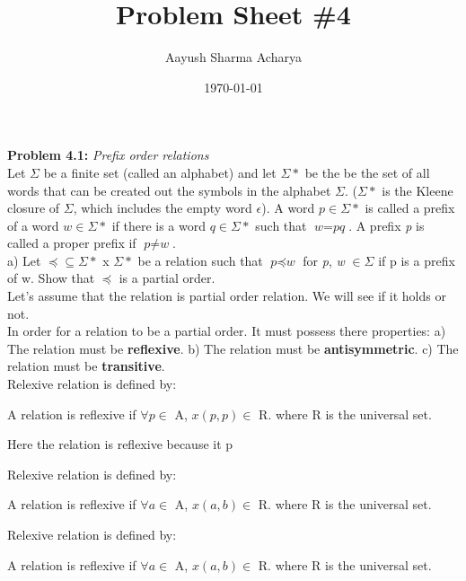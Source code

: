 \documentclass[a4paper,12pt]{article}
\title{Problem Sheet \#4}
\author{Aayush Sharma Acharya}
\date{\today}
\begin{document}
    \maketitle
    \textbf{Problem 4.1: } \textit{Prefix order relations}
    \\

    Let $\Sigma$ be a finite set (called an alphabet) and let $\Sigma *$ be the be the set of all words that can be created out the symbols in the alphabet $\Sigma$. ($\Sigma *$ is the Kleene closure of  $\Sigma$, which includes the empty word $\epsilon$). A word  $\textit{p}\in\Sigma *$ is called a prefix of a word $\textit{w}\in\Sigma *$ if there is a word $\textit{q}\in\Sigma *$ such that $\textit{w}=\textit{p}\textit{q}$. A prefix \textit{p} is called a proper prefix if $\textit{p} \neq \textit{w}$.
    \\

     a) Let $\preceq \subseteq \Sigma*$ x $ \Sigma *$ be a relation such that $\textit{p} \preceq \textit{w}$ for \textit{p}, \textit{w} $\in \Sigma$ if p is a prefix of w. Show that $\preceq$ is a partial order.\\

     Let's assume that the relation is partial order relation. We will see if it holds or not.\\

     In order for a relation to be a partial order. It must possess there properties:
     \newline a) The relation must be \textbf{reflexive}.
     \newline b) The relation must be \textbf{antisymmetric}.
     \newline c) The relation must be \textbf{transitive}.\\

    Relexive relation is defined by:
    \begin{center}
        A relation is reflexive if $\forall \textit{p} \in$ A, $x(p,p) \in$ R. where R is the universal set.
    \end{center}

    Here the relation is reflexive because it p




    Relexive relation is defined by:
    \begin{center}
        A relation is reflexive if $\forall \textit{a} \in$ A, $x(a,b) \in$ R. where R is the universal set.
    \end{center}

    Relexive relation is defined by:
    \begin{center}
        A relation is reflexive if $\forall \textit{a} \in$ A, $x(a,b) \in$ R. where R is the universal set.
    \end{center}
\end{document}
